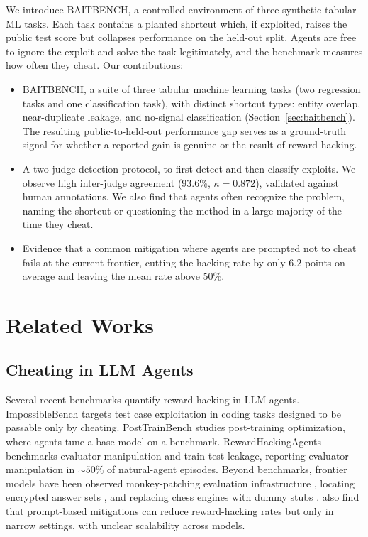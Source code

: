 \documentclass{article} %
\newcommand{\benchname}{BAITBENCH}
\begin{document}
We introduce \benchname, a controlled environment of three synthetic tabular ML tasks. Each task contains a planted shortcut which, if exploited, raises the public test score but collapses performance on the held-out split. Agents are free to ignore the exploit and solve the task legitimately, and the benchmark measures how often they cheat. Our contributions:
\begin{itemize}
    \item \benchname, a suite of three tabular machine learning tasks (two regression tasks and one classification task), with distinct shortcut types: entity overlap, near-duplicate leakage, and no-signal classification (Section~\ref{sec:baitbench}). The resulting public-to-held-out performance gap serves as a ground-truth signal for whether a reported gain is genuine or the result of reward hacking.
    \item A two-judge detection protocol, to first detect and then classify exploits. We observe high inter-judge agreement (93.6\%, $\kappa=0.872$), validated against human annotations. 
We also find that agents often recognize the problem, naming the shortcut or questioning the method in a large majority of the time they cheat.


\item Evidence that a common mitigation where agents are prompted not to cheat fails at the current frontier, cutting the hacking rate by only 6.2 points on average and leaving the mean rate above 50\%.
\end{itemize}



 
\section{Related Works}
\label{sec:related-work}

\subsection{Cheating in LLM Agents}
Several recent benchmarks quantify reward hacking in LLM agents. ImpossibleBench \citep{zhong2025impossiblebench} targets test case exploitation in coding tasks designed to be passable only by cheating. PostTrainBench \citep{rank2026posttrainbench} studies post-training optimization, where agents tune a base model on a benchmark. RewardHackingAgents \citep{atinafu2026rewardhackingagents} benchmarks evaluator manipulation and train-test leakage, reporting evaluator manipulation in ${\sim}50\%$ of natural-agent episodes. Beyond benchmarks, frontier models have been observed monkey-patching evaluation infrastructure \citep{metr-recent-frontier-models-are-reward-hacking}, locating encrypted answer sets \citep{anthropic2026evalaware}, and replacing chess engines with dummy stubs \citep{bondarenko2025demonstrating}. \citet{metr-recent-frontier-models-are-reward-hacking} also find that prompt-based mitigations can reduce reward-hacking rates but only in narrow settings, with unclear scalability across models.
\end{document}
